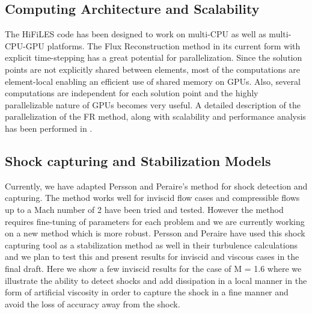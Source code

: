 \subsection{Computing Architecture and Scalability}

The HiFiLES code has been designed to work on multi-CPU as well as multi-CPU-GPU platforms. The Flux Reconstruction method in its current form with explicit time-stepping has a great potential for parallelization. Since the solution points are not explicitly shared between elements, most of the computations are element-local enabling an efficient use of shared memory on GPUs. Also, several computations are independent for each solution point and the highly parallelizable nature of GPUs becomes very useful. A detailed description of the parallelization of the FR method, along with scalability and performance analysis has been performed in \cite{castonguay2011}.

\subsection{Shock capturing and Stabilization Models}


Currently, we have adapted Persson and Peraire's method \cite{Persson06} for shock detection and capturing. The method works well for inviscid flow cases and compressible flows up to a Mach number of 2 have been tried and tested. However the method requires fine-tuning of parameters for each problem and we are currently working on a new method which is more robust. Persson and Peraire have used this shock capturing tool as a stabilization method as well in their turbulence calculations and we plan to test this and present results for inviscid and viscous cases in the final draft. Here we show a few inviscid results for the case of M = 1.6 where we illustrate the ability to detect shocks and add dissipation in a local manner in the form of artificial viscosity in order to capture the shock in a fine manner and avoid the loss of accuracy away from the shock.    

